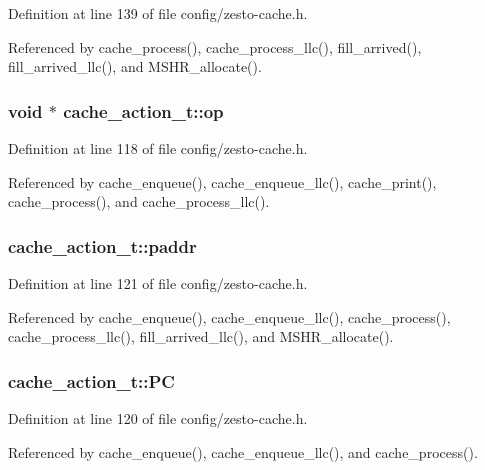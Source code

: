 Definition at line 139 of file config/zesto-cache.h.

Referenced by cache\_\-process(), cache\_\-process\_\-llc(), fill\_\-arrived(), fill\_\-arrived\_\-llc(), and MSHR\_\-allocate().
\subsubsection[{op}]{\setlength{\rightskip}{0pt plus 5cm}void $\ast$ {\bf cache\_\-action\_\-t::op}}\label{structcache__action__t_6e57ed2a77ffee9cb1485224f6b53059}




Definition at line 118 of file config/zesto-cache.h.

Referenced by cache\_\-enqueue(), cache\_\-enqueue\_\-llc(), cache\_\-print(), cache\_\-process(), and cache\_\-process\_\-llc().
\subsubsection[{paddr}]{ {\bf cache\_\-action\_\-t::paddr}}\label{structcache__action__t_80a7e307c0b098c1012c919d175b9adc}




Definition at line 121 of file config/zesto-cache.h.

Referenced by cache\_\-enqueue(), cache\_\-enqueue\_\-llc(), cache\_\-process(), cache\_\-process\_\-llc(), fill\_\-arrived\_\-llc(), and MSHR\_\-allocate().
\subsubsection[{PC}]{ {\bf cache\_\-action\_\-t::PC}}\label{structcache__action__t_48e1c8301f767c02f17dcd9593ddc284}




Definition at line 120 of file config/zesto-cache.h.

Referenced by cache\_\-enqueue(), cache\_\-enqueue\_\-llc(), and cache\_\-process().
